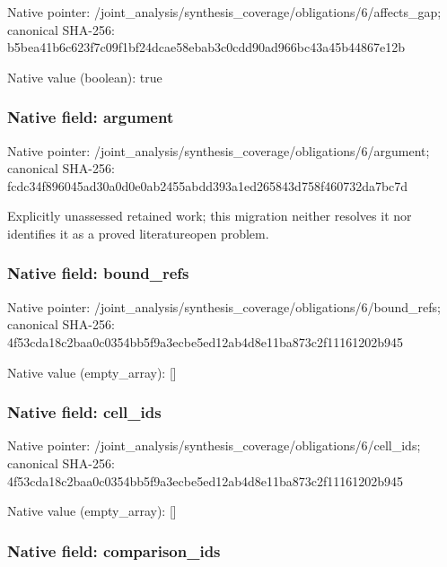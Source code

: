 \documentclass[10pt,a4paper]{article}
\begin{document}
Native pointer: /joint\_analysis/synthesi\allowbreak{}s\_coverage/obligations/6\allowbreak{}/affects\_gap; canonical SHA-256: b5bea41b6c623f7c09f1bf24\allowbreak{}dcae58ebab3c0cdd90ad966b\allowbreak{}c43a45b44867e12b



Native value (boolean): true



\subsubsection{Native field: argument}


Native pointer: /joint\_analysis/synthesi\allowbreak{}s\_coverage/obligations/6\allowbreak{}/argument; canonical SHA-256: fcdc34f896045ad30a0d0e0a\allowbreak{}b2455abdd393a1ed265843d7\allowbreak{}58f460732da7bc7d


Explicitly unassessed retained work; this migration neither resolves it nor identifies it as a proved literatureopen problem.


\subsubsection{Native field: bound\_refs}


Native pointer: /joint\_analysis/synthesi\allowbreak{}s\_coverage/obligations/6\allowbreak{}/bound\_refs; canonical SHA-256: 4f53cda18c2baa0c0354bb5f\allowbreak{}9a3ecbe5ed12ab4d8e11ba87\allowbreak{}3c2f11161202b945



Native value (empty\_array): []



\subsubsection{Native field: cell\_ids}


Native pointer: /joint\_analysis/synthesi\allowbreak{}s\_coverage/obligations/6\allowbreak{}/cell\_ids; canonical SHA-256: 4f53cda18c2baa0c0354bb5f\allowbreak{}9a3ecbe5ed12ab4d8e11ba87\allowbreak{}3c2f11161202b945



Native value (empty\_array): []



\subsubsection{Native field: comparison\_ids}
\end{document}
